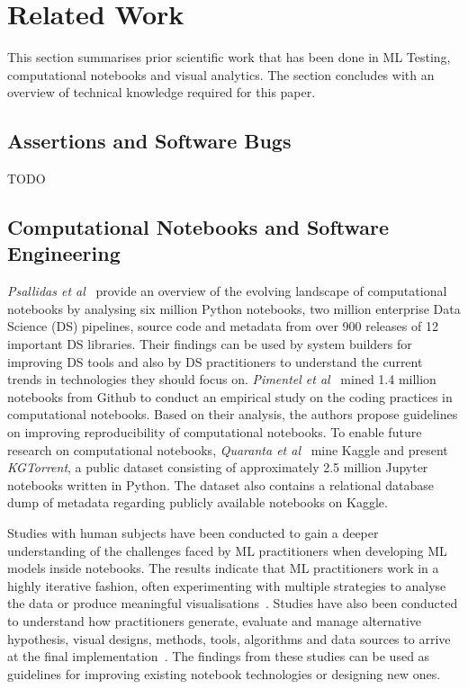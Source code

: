 \section{Related Work}\label{sec:related}

This section summarises prior scientific work that has been done in ML
Testing, computational notebooks and visual analytics. The section
concludes with an overview of technical knowledge required for this
paper.

\subsection{Assertions and Software Bugs}
 TODO

\subsection{Computational Notebooks and Software Engineering}\label{sec:notebooks}

\emph{Psallidas et al}~\cite{psallidas2019data} provide an overview of the evolving landscape of computational notebooks by analysing six million Python notebooks, two million enterprise Data Science (DS) pipelines, source code and metadata from over 900 releases of 12 important DS libraries. Their findings can be used by system builders for improving DS tools and also by DS practitioners to understand the current trends in technologies they should focus on. \emph{Pimentel et al}~\cite{pimentel2019large-scale} mined 1.4 million notebooks from Github to conduct an empirical study on the coding practices in computational notebooks. Based on their analysis, the authors propose guidelines on improving reproducibility of computational notebooks. To enable future research on computational notebooks, \emph{Quaranta et al}~\cite{quaranta2021kgtorrent} mine Kaggle and present \textit{KGTorrent}, a public dataset consisting of approximately 2.5 million Jupyter notebooks written in Python. The dataset also contains a relational database dump of metadata regarding publicly available notebooks on Kaggle.

Studies with human subjects have been conducted to gain a deeper understanding of the challenges faced by ML practitioners when developing ML models inside notebooks. The results indicate that ML practitioners work in a highly iterative fashion, often experimenting with multiple strategies to analyse the data or produce meaningful visualisations~\cite{kandel2012enterprise, kery2018story, liu2019understanding, chattopadhyay2020whats}. Studies have also been conducted to understand how practitioners generate, evaluate and manage alternative hypothesis, visual designs, methods, tools, algorithms and data sources to arrive at the final implementation~\cite{liu2019understanding,kandel2012enterprise}. The findings from these studies can be used as guidelines for improving existing notebook technologies or designing new ones.

